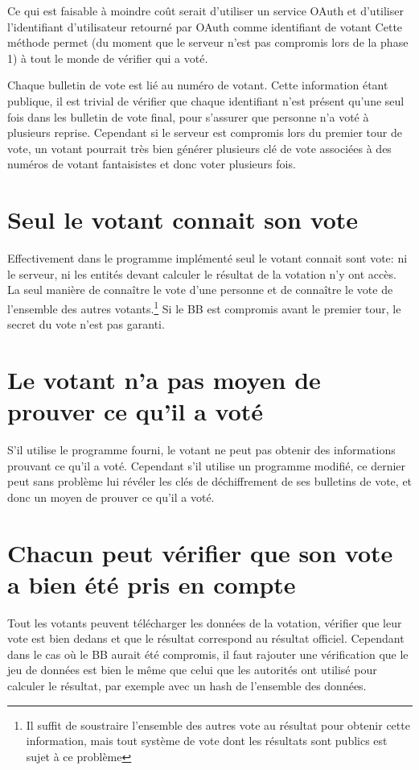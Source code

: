 \documentclass[../report]{subfiles}
\begin{document}
Ce qui est faisable à moindre coût serait d'utiliser un service OAuth et d'utiliser l'identifiant
d'utilisateur retourné par OAuth comme identifiant de votant
Cette méthode permet (du moment que le serveur n'est pas compromis lors de la phase 1)
à tout le monde de vérifier qui a voté.

Chaque bulletin de vote est lié au numéro de votant. 
Cette information étant publique, il est trivial de vérifier que chaque identifiant n'est présent
qu'une seul fois dans les bulletin de vote final, pour s'assurer que personne n'a voté à plusieurs reprise.
Cependant si le serveur est compromis lors du premier tour de vote, un votant pourrait très bien
générer plusieurs clé de vote associées à des numéros de votant fantaisistes et donc voter 
plusieurs fois.

\section{Seul le votant connait son vote}

Effectivement dans le programme implémenté seul le votant connait sont vote: ni le serveur, 
ni les entités devant calculer le résultat de la votation n'y ont accès.
La seul manière de connaître le vote d'une personne et de connaître le vote de l'ensemble 
des autres votants.\footnote{Il suffit de soustraire l'ensemble des autres vote au résultat
pour obtenir cette information, mais tout système de vote dont les résultats sont publics est
sujet à ce problème}
Si le BB est compromis avant le premier tour, le secret du vote n'est pas garanti.

\section{Le votant n'a pas moyen de prouver ce qu'il a voté}

S'il utilise le programme fourni, le votant ne peut pas obtenir des informations prouvant ce qu'il a voté.
Cependant s'il utilise un programme modifié, ce dernier peut sans problème lui révéler les clés de déchiffrement
de ses bulletins de vote, et donc un moyen de prouver ce qu'il a voté.

\section{Chacun peut vérifier que son vote a bien été pris en compte}

Tout les votants peuvent télécharger les données de la votation, vérifier que leur vote est bien dedans et que le résultat 
correspond au résultat officiel.
Cependant dans le cas où le BB aurait été compromis, il faut rajouter une vérification que le jeu de données est bien le même que celui
que les autorités ont utilisé pour calculer le résultat, par exemple avec un hash de l'ensemble des données.
\end{document}
